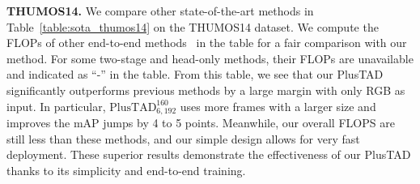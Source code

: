 \documentclass[a4paper,fleqn]{cas-dc}
\begin{document}
\textbf{THUMOS14.}
We compare other state-of-the-art methods in Table~\ref{table:sota_thumos14} on the THUMOS14 dataset. 
We compute the FLOPs of other end-to-end methods~\citep{afsd,rgb_enough,e2e-TADTR,r-c3d} in the table for a fair comparison with our method. 
For some two-stage and head-only methods, their FLOPs are unavailable and indicated as ``-'' in the table.
From this table, we see that our PlusTAD significantly outperforms previous methods by a large margin with only RGB as input. 
In particular, $\text{PlusTAD}_{6,192}^{160}$ uses more frames with a larger size and improves the mAP jumps by 4 to 5 points.
Meanwhile, our overall FLOPS are still less than these methods, and our simple design allows for very fast deployment.
These superior results demonstrate the effectiveness of our PlusTAD thanks to its simplicity and end-to-end training. 


\begin{table*}[t]
\centering
\small
\caption{\textbf{Comparison with state of the art on the FineAction dataset.} ``RGB-Only" means whether to use other input modalities besides RGB input.}
\setlength\tabcolsep{4.45mm}
\label{table:fineaction}
\end{table*}
\end{document}
